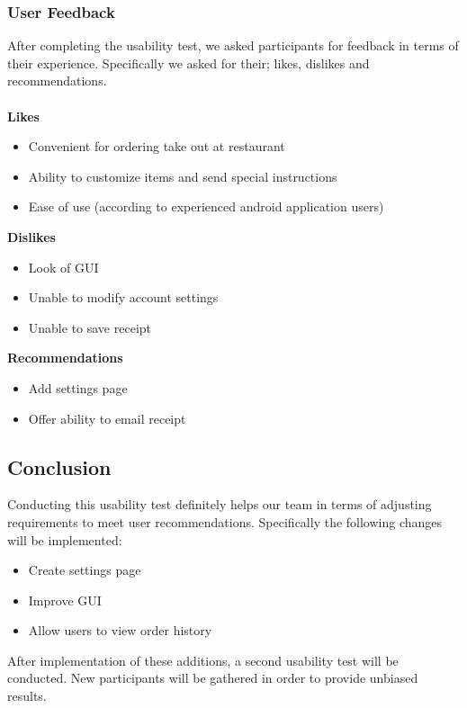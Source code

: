\documentclass[12pt, titlepage]{article}
\begin{document}
\subsubsection{User Feedback}

After completing the usability test, we asked participants for feedback in terms of their experience. Specifically we asked for their; likes, dislikes and recommendations. 
\\\\
\textbf{Likes} 
\begin{itemize}
\item Convenient for ordering take out at restaurant  
\item Ability to customize items and send special instructions
\item Ease of use (according to experienced android application users)
\end{itemize}
\textbf{Dislikes}
\begin{itemize}
\item Look of GUI
\item Unable to modify account settings
\item Unable to save receipt 
\end{itemize}
\textbf{Recommendations}  
\begin{itemize}
\item Add settings page
\item Offer ability to email receipt
\end{itemize}
\subsection{Conclusion}
Conducting this usability test definitely helps our team in terms of adjusting requirements to meet user recommendations. Specifically the following changes will be implemented: 
\begin{itemize}
\item Create settings page
\item Improve GUI
\item Allow users to view order history
\end{itemize}
After implementation of these additions, a second usability test will be conducted. New participants will be gathered in order to provide unbiased results. 
\end{document}
